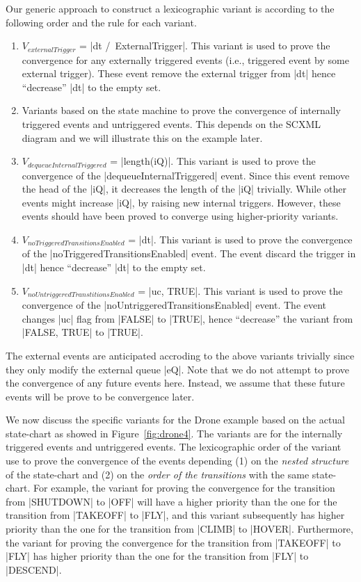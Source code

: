 Our generic approach to construct a lexicographic variant is according
to the following order and the rule for each variant.
\begin{enumerate}
\item $V_{externalTrigger}$ = |dt /\ ExternalTrigger|.  This variant
  is used to prove the convergence for any externally triggered events
  (i.e., triggered event by some external trigger). These event remove
  the external trigger from |dt| hence ``decrease'' |dt| to the empty
  set.

\item Variants based on the state machine to prove the convergence of
  internally triggered events and untriggered events.  This depends on
  the SCXML diagram and we will illustrate this on the example later.
  
\item $V_{dequeueInternalTriggered}$ = |length(iQ)|.  This variant is
  used to prove the convergence of the |dequeueInternalTriggered| event.
  Since this event remove the head of the |iQ|, it decreases the
  length of the |iQ| trivially.  While other events might increase
  |iQ|, by raising new internal triggers. However, these events should
  have been proved to converge using higher-priority variants.
  
\item $V_{noTriggeredTransitionsEnabled}$ = |dt|.  This variant is used to
  prove the convergence of the |noTriggeredTransitionsEnabled| event.
  The event discard the trigger in |dt| hence ``decrease'' |dt| to the
  empty set.
  
\item $V_{noUntriggeredTranstitionsEnabled}$ = |{uc, TRUE}|.  This variant is
  used to prove the convergence of the
  |noUntriggeredTransitionsEnabled| event.  The event changes |uc|
  flag from |FALSE| to |TRUE|, hence ``decrease'' the variant from
  |{FALSE, TRUE}| to |{TRUE}|.
\end{enumerate}
The external events are anticipated accroding to the above variants
trivially since they only modify the external queue |eQ|.  Note that
we do not attempt to prove the convergence of any future events
here. Instead, we assume that these future events will be prove to be
convergence later.

We now discuss the specific variants for the Drone example based on
the actual state-chart as showed in Figure~\ref{fig:drone4}.  The
variants are for the internally triggered events and untriggered
events. The lexicographic order of the variant use to prove the
convergence of the events depending (1) on the \emph{nested structure}
of the state-chart and (2) on the \emph{order of the transitions} with
the same state-chart.  For example, the variant for proving the
convergence for the transition from |SHUTDOWN| to |OFF| will have a
higher priority than the one for the transition from |TAKEOFF| to
|FLY|, and this variant subsequently has higher priority than the one
for the transition from |CLIMB| to |HOVER|.  Furthermore, the variant
for proving the convergence for the transition from |TAKEOFF| to |FLY|
has higher priority than the one for the transition from |FLY| to
|DESCEND|.

